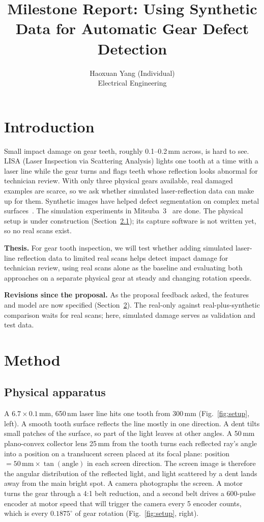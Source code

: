 \documentclass{article}
\title{Milestone Report: Using Synthetic Data for Automatic Gear Defect Detection}
\author{Haoxuan Yang (Individual)\\
Electrical Engineering}
\begin{document}
\maketitle

\section{Introduction}

Small impact damage on gear teeth, roughly 0.1--0.2\,mm across, is hard to see. LISA (Laser Inspection via Scattering Analysis) lights one tooth at a time with a laser line while the gear turns and flags teeth whose reflection looks abnormal for technician review. With only three physical gears available, real damaged examples are scarce, so we ask whether simulated laser-reflection data can make up for them. Synthetic images have helped defect segmentation on complex metal surfaces~\cite{fulir2023}. The simulation experiments in Mitsuba~3~\cite{mitsuba3} are done. The physical setup is under construction (Section~\ref{sec:apparatus}); its capture software is not written yet, so no real scans exist.

\textbf{Thesis.} For gear tooth inspection, we will test whether adding simulated laser-line reflection data to limited real scans helps detect impact damage for technician review, using real scans alone as the baseline and evaluating both approaches on a separate physical gear at steady and changing rotation speeds.

\textbf{Revisions since the proposal.} As the proposal feedback asked, the features and model are now specified (Section~\ref{sec:method}). The real-only against real-plus-synthetic comparison waits for real scans; here, simulated damage serves as validation and test data.

\section{Method}
\label{sec:method}

\subsection{Physical apparatus}
\label{sec:apparatus}

A $6.7\times0.1$\,mm, 650\,nm laser line hits one tooth from 300\,mm (Fig.~\ref{fig:setup}, left). A smooth tooth surface reflects the line mostly in one direction. A dent tilts small patches of the surface, so part of the light leaves at other angles. A 50\,mm plano-convex collector lens 25\,mm from the tooth turns each reflected ray's angle into a position on a translucent screen placed at its focal plane: position $=50\,\text{mm}\times\tan(\text{angle})$ in each screen direction. The screen image is therefore the angular distribution of the reflected light, and light scattered by a dent lands away from the main bright spot. A camera photographs the screen. A motor turns the gear through a 4:1 belt reduction, and a second belt drives a 600-pulse encoder at motor speed that will trigger the camera every 5 encoder counts, which is every $0.1875^\circ$ of gear rotation (Fig.~\ref{fig:setup}, right).
\end{document}
